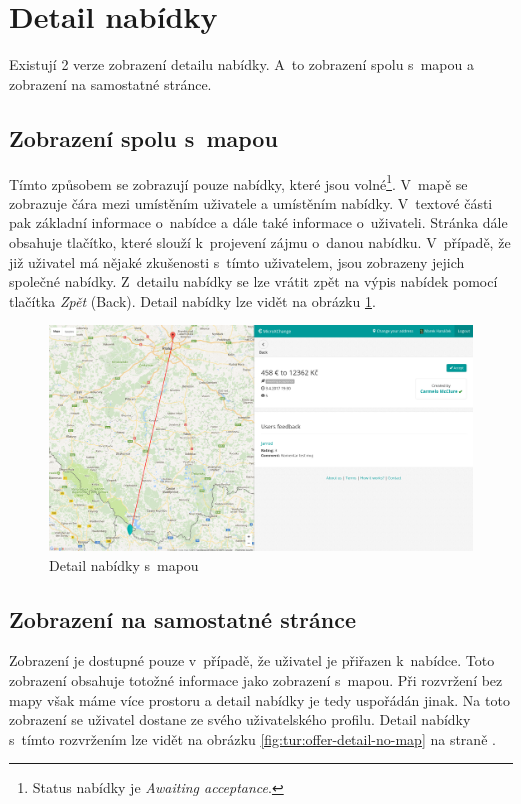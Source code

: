 \section{Detail nabídky}

\label{nur:detail}

Existují 2 verze zobrazení detailu nabídky. A~to zobrazení spolu s~mapou a zobrazení na samostatné stránce.

\subsection{Zobrazení spolu s~mapou}
Tímto způsobem se zobrazují pouze nabídky, které jsou volné\footnote{Status nabídky je \textit{Awaiting acceptance}.}. V~mapě se zobrazuje čára mezi umístěním uživatele a umístěním nabídky. V~textové části pak základní informace o~nabídce a dále také informace o~uživateli. Stránka dále obsahuje tlačítko, které slouží k~projevení zájmu o~danou nabídku. V~případě, že již uživatel má nějaké zkušenosti s~tímto uživatelem, jsou zobrazeny jejich společné nabídky. Z~detailu nabídky se lze vrátit zpět na výpis nabídek pomocí tlačítka \textit{Zpět} (Back). Detail nabídky lze vidět na obrázku \ref{fig:tur:offer-detail-map}.

\begin{figure}[!h]
    \centering
    \includegraphics[width=1.0\textwidth]{media/tur/offer-detail-map.png}
    \caption{Detail nabídky s~mapou}
    \label{fig:tur:offer-detail-map}
\end{figure}

\subsection{Zobrazení na samostatné stránce}
Zobrazení je dostupné pouze v~případě, že uživatel je přiřazen k~nabídce. Toto zobrazení obsahuje totožné informace jako zobrazení s~mapou. Při rozvržení bez mapy však máme více prostoru a detail nabídky je tedy uspořádán jinak. Na toto zobrazení se uživatel dostane ze svého uživatelského profilu. Detail nabídky s~tímto rozvržením lze vidět na obrázku \ref{fig:tur:offer-detail-no-map} na straně \pageref{fig:tur:offer-detail-no-map}.

